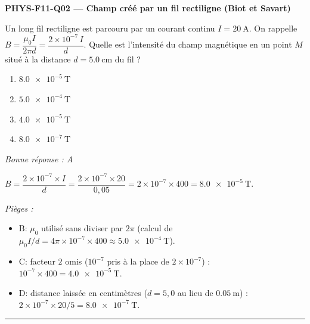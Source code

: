 \documentclass[11pt,a4paper]{article}
\newcommand{\vv}[1]{\vec{#1}}\newcommand{\ds}{\displaystyle}
\begin{document}
\noindent\textbf{PHYS-F11-Q02 --- Champ créé par un fil rectiligne (Biot et Savart)}\par
Un long fil rectiligne est parcouru par un courant continu $I=\qty{20}{\ampere}$. On rappelle $B=\dfrac{\mu_0 I}{2\pi d}=\dfrac{2\times10^{-7}\,I}{d}$. Quelle est l'intensité du champ magnétique en un point $M$ situé à la distance $d=\qty{5.0}{\centi\metre}$ du fil ?
\begin{center}
\end{center}
\begin{enumerate}[label=\Alph*)]
\item $\qty{8.0e-5}{\tesla}$
\item $\qty{5.0e-4}{\tesla}$
\item $\qty{4.0e-5}{\tesla}$
\item $\qty{8.0e-7}{\tesla}$
\end{enumerate}
\textit{Bonne réponse : A}\par
$B=\dfrac{2\times10^{-7}\times I}{d}=\dfrac{2\times10^{-7}\times 20}{0{,}05}=2\times10^{-7}\times 400=\qty{8.0e-5}{\tesla}$.\par
\textit{Pièges :}
\begin{itemize}
\item B: $\mu_0$ utilisé sans diviser par $2\pi$ (calcul de $\mu_0 I/d=4\pi\times10^{-7}\times400\approx\qty{5.0e-4}{\tesla}$).
\item C: facteur $2$ omis ($10^{-7}$ pris à la place de $2\times10^{-7}$) : $10^{-7}\times400=\qty{4.0e-5}{\tesla}$.
\item D: distance laissée en centimètres ($d=5{,}0$ au lieu de $\qty{0.05}{\metre}$) : $2\times10^{-7}\times20/5=\qty{8.0e-7}{\tesla}$.
\end{itemize}
\vspace{8pt}\hrule\vspace{8pt}
\end{document}

